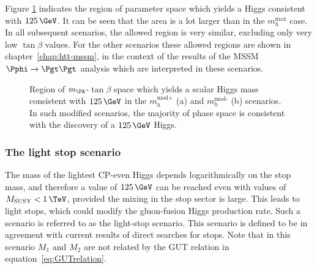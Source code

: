 Figure \ref{fig:mhmodmass} indicates the region of parameter space which yields
a Higgs consistent with $125\,\GeV$. It can be seen that the area is a lot larger
than in the $m_{h}^{\text{max}}$ case. In all subsequent scenarios, the allowed
region is very similar, excluding only very low $\tan\beta$ values. For the
other scenarios these allowed regions are shown in chapter~\ref{chap:htt-mssm},
in the context of the results of the \ac{MSSM} $\Pphi \to \Pgt\Pgt$ analysis which
are interpreted in these scenarios.

\begin{figure}[htbp]
\caption[Region of $m_{\PA}$-$\tan\beta$ space which yields a scalar Higgs mass 
consistent with $125\,\GeV$ in the $m_{h}^{\text{mod}}$ scenarios.]
{Region of $m_{\PA}$-$\tan\beta$ space which yields a scalar Higgs mass 
consistent with $125\,\GeV$ in the $m_{h}^{\text{mod+}}$ (a) and
$m_{h}^{\text{mod-}}$ (b) scenarios. In such modified scenarios, the
majority of phase space is consistent with the discovery of a $125\,\GeV$ Higgs.}
\label{fig:mhmodmass}
\end{figure}

\subsubsection{The light stop scenario}
\label{sec:lightstopscenario}

The mass of the lightest CP-even Higgs depends logarithmically on the stop mass,
and therefore a value of $125\,\GeV$ can be reached even with values of
$M_{\text{SUSY}} < 1\,\TeV$, provided the mixing in the stop sector is large. This
leads to light stops, which could modify the gluon-fusion Higgs production rate.
Such a scenario is referred to as the light-stop scenario. This scenario is
defined to be in agreement with current results of direct searches for stops.
Note that in this scenario $M_{1}$ and $M_{2}$ are not related by the GUT
relation in equation~\ref{eq:GUTrelation}. 

